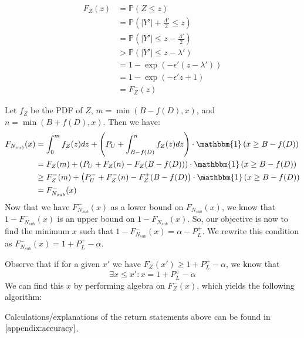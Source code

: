 \documentclass[11pt]{scrartcl} %
\begin{document}
\begin{align}
	F_{Z}(z) &= \mathbb{P}(Z \leq z) \nonumber \\
			 &= \mathbb{P}\left( \vert Y' \vert + \frac{\Lambda'}{2} \leq z \right) \nonumber \\
			 &= \mathbb{P} \left( \vert Y' \vert \leq z - \frac{\Lambda'}{2} \right) \nonumber \\
			 &> \mathbb{P} \left( \vert Y' \vert \leq z - \lambda' \right) \nonumber \\
			 &= 1 - \exp\left( -\epsilon'(z - \lambda') \right) \nonumber \\
			 &= 1 - \exp\left( -\epsilon'z + 1 \right) \nonumber \\
			 &= F_{Z}^{-}(z) \nonumber
\end{align}

Let $f_Z$ be the PDF of $Z$, $m = \min\left(B-f(D),x\right)$, and $n = \min\left(B+f(D),x\right)$.  Then we have:
\begin{align}
	F_{N_{sub}}(x) &= \int_{0}^{m} f_{Z}(z)dz + \left( P_{U} + \int_{B - f(D)}^{n} f_{Z}(z)dz \right) \cdot \mathbbm{1}\left(x \geq B - f(D)\right) \nonumber \\
				   &= F_{Z}(m) + \left( P_{U}  + F_{Z}(n) - F_{Z}(B - f(D)) \right) \cdot \mathbbm{1}\left( x \geq B - f(D) \right)   \nonumber \\
				   &\geq F_{Z}^{-}(m) + \left( P_{U}^{-} + F_{Z}^{-}(n) - F_{Z}^{+}(B - f(D) \right) \cdot \mathbbm{1}\left(x \geq B - f(D)\right) \nonumber \\
				   &= F_{N_{sub}}^{-}(x) \nonumber
\end{align}
Now that we have $F_{N_{sub}}^{-}(x)$ as a lower bound on $F_{N_{sub}}(x)$, we know that
$1 - F_{N_{sub}}^{-}(x)$ is an upper bound on $1 - F_{N_{sub}}(x)$.
So, our objective is now to find the minimum $x$ such that $1 - F_{N_{sub}}^{-}(x) = \alpha - P_{L}^{+}$.
We rewrite this condition as $F_{N_{sub}}^{-}(x) = 1 + P_{L}^{+} - \alpha$. \newline

Observe that if for a given $x'$ we have
$F_{Z}^{-}(x') \geq 1 + P_{L}^{+} - \alpha$, we know that
\[ \exists x \leq x': x = 1 + P_{L}^{+} - \alpha \]
We can find this $x$ by performing algebra on $F_{Z}^{-}(x)$, which yields the following algorithm:

\begin{algorithm}
	\label{GetAccuracy}
	\begin{algorithmic}
				\State{}
				\State{}
				\State{}
			\Else{}
				\State{}
			\EndIf
		\EndFunction
	\end{algorithmic}
\end{algorithm}
Calculations/explanations of the return statements above can be found in $\autoref{appendix:accuracy}$. \newline
\end{document}
